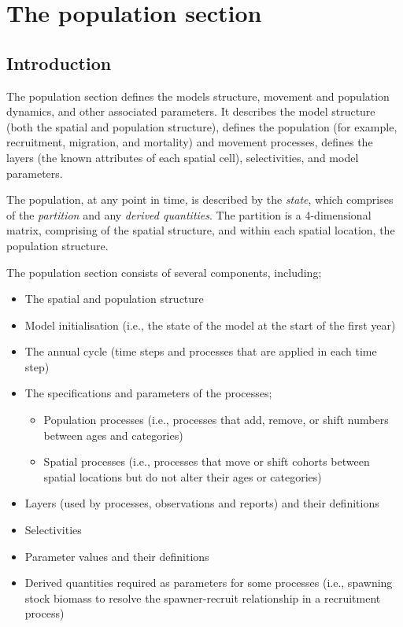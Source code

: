 \section{The population section\label{sec:population-section}}

\subsection{Introduction}

The population section defines the models structure, movement and population dynamics, and other associated parameters. It describes the model structure (both the spatial and population structure), defines the population  (for example, recruitment, migration, and mortality) and movement processes, defines the layers (the known attributes of each spatial cell), selectivities, and model parameters.

The population, at any point in time, is described by the \emph{state}, which comprises of the \emph{partition} and any \emph{derived quantities}. The partition is a 4-dimensional matrix, comprising of the spatial structure, and within each spatial location, the population structure. 

The population section consists of several components, including;
\begin{itemize}
  \item The spatial and population structure
  \item Model initialisation (i.e., the state of the model at the start of the first year)
  \item The annual cycle (time steps and processes that are applied in each time step)
  \item The specifications and parameters of the processes;
  \begin{itemize}
    \item Population processes (i.e., processes that add, remove, or shift numbers between ages and categories)
    \item Spatial processes (i.e., processes that move or shift cohorts between spatial locations but do not alter their ages or categories)
  \end{itemize}
  \item Layers (used by processes, observations and reports) and their definitions
  \item Selectivities
  \item Parameter values and their definitions
  \item Derived quantities required as parameters for some processes (i.e., spawning stock biomass to resolve the spawner-recruit relationship in a recruitment process)
\end{itemize}

